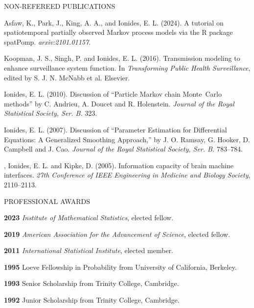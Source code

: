 \begin{reflist} {NON-REFEREED PUBLICATIONS}

\item Asfaw, K., Park, J., King, A. A., and Ionides, E. L. (2024). A tutorial on spatiotemporal partially observed Markov process models via the R package spatPomp. {\it arxiv:2101.01157}.
  
\item
Koopman, J. S., Singh, P. and Ionides, E. L. (2016). Transmission modeling to enhance surveillance system function. In {\em Transforming Public Health Surveillance}, edited by S. J. N. McNabb et al. Elsevier.

\item\formal{[[\ionidesJRSSBb] ]} 
Ionides, E. L. (2010). Discussion of ``Particle Markov chain Monte~Carlo methods'' by C. Andrieu, A. Doucet and R. Holenstein.
{\em Journal of the Royal Statistical Society, Ser. B.} {}{\separator}323.

\item\formal{[[\ionidesJRSSBa] ]}  
Ionides, E. L. (2007). Discussion of ``Parameter Estimation for Differential Equations: A Generalized Smoothing Approach,'' by J. O. Ramsay, G. Hooker, D. Campbell and J. Cao. 
{\em Journal of the Royal Statistical Society, Ser. B.} {}{\separator}783--784.

\item\formal{[[\gageEMBS] ]}  
, Ionides, E. L. and
  Kipke, D. (2005). Information capacity of brain machine
  interfaces. {\em 27th Conference of IEEE Engineering in
  Medicine and Biology Society}, 2110--2113.


\end{reflist}

\lsp

\begin{mylist}{PROFESSIONAL AWARDS}

\item{\bf 2023}  {\it Institute of Mathematical Statistics}, elected fellow.

\item{\bf 2019}  {\it American Association for the Advancement of Science}, elected fellow. 

\item{\bf 2011} {\it International Statistical Institute}, elected member.
  
\item{\bf 1995 } Loeve Fellowship in Probability from University of California, Berkeley.

\item{\bf 1993 } Senior Scholarship from Trinity College, Cambridge.

\item{\bf 1992 } Junior Scholarship from Trinity College, Cambridge.

\end{mylist}

